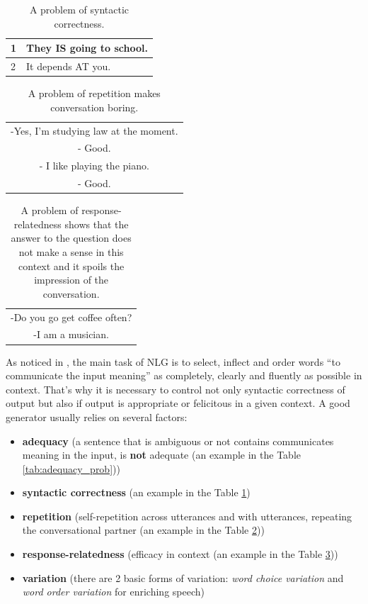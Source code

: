 \begin{table}[ht]
\centering
 \begin{tabular}{|p{0.5cm}|p{8cm}|} 
 \hline
 1 & They IS going to school. \\ 
 \hline
 2 & It depends AT you. \\
 \hline
 \end{tabular}
 \caption{A problem of syntactic correctness.}
\label{tab:syntactic_corr_prob}
\end{table}

\begin{table}[ht]
\centering
 \begin{tabular}{|c|} 
 \hline
  -Yes, I'm studying law at the moment.\\
  - Good. \\
  - I like playing the piano. \\
  - Good. \\
 \hline
 \end{tabular}
 \caption{A problem of repetition makes conversation boring.}
\label{tab:repetition_prob}
\end{table}

\begin{table}[ht]
\centering
 \begin{tabular}{|c|} 
 \hline
 -Do you go get coffee often? \\
 -I am a musician. \\
 \hline
 \end{tabular}
 \caption{A problem of response-relatedness shows that the answer to the question does not make a sense in this context and it spoils the impression of the conversation.}
\label{tab:response_relatedness_prob}
\end{table}

As noticed in \cite{stent2005evaluating}, the main task of NLG is to select, inflect and order words ``to communicate the input meaning'' as completely, clearly and fluently as possible in context. That's why it is necessary to control not only syntactic correctness of output but also if output is appropriate or felicitous in a given context. A good generator usually relies on several factors:
\begin{itemize}
  \item \textbf{adequacy} (a sentence that is ambiguous or not contains communicates meaning in the input, is \textbf{not} adequate (an example in the Table \ref{tab:adequacy_prob}))  
  \item \textbf{syntactic correctness} (an example in the Table \ref{tab:syntactic_corr_prob})
  \item \textbf{repetition} (self-repetition across utterances and with utterances, repeating the conversational partner (an example in the Table \ref{tab:repetition_prob}))
  \item \textbf{response-relatedness} (efficacy in context (an example in the Table \ref{tab:response_relatedness_prob}))
  \item \textbf{variation} (there are 2 basic forms of variation: \textit{word choice variation} and \textit{word order variation} for enriching speech)
\end{itemize}

